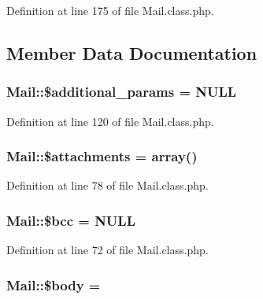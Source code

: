 Definition at line 175 of file Mail.\+class.\+php.



\subsection{Member Data Documentation}
\hypertarget{classMail_a38466de017089677f088c9a4025f724f}{}
\subsubsection[{\$additional\+\_\+params}]{\setlength{\rightskip}{0pt plus 5cm}Mail\+::\$additional\+\_\+params = N\+U\+L\+L}\label{classMail_a38466de017089677f088c9a4025f724f}


Definition at line 120 of file Mail.\+class.\+php.

\hypertarget{classMail_a93b05b1003cc8ea16b59c00d77f47466}{}
\subsubsection[{\$attachments}]{\setlength{\rightskip}{0pt plus 5cm}Mail\+::\$attachments = array()}\label{classMail_a93b05b1003cc8ea16b59c00d77f47466}


Definition at line 78 of file Mail.\+class.\+php.

\hypertarget{classMail_a2e25b3c43459422d40765d581b165692}{}
\subsubsection[{\$bcc}]{\setlength{\rightskip}{0pt plus 5cm}Mail\+::\$bcc = N\+U\+L\+L}\label{classMail_a2e25b3c43459422d40765d581b165692}


Definition at line 72 of file Mail.\+class.\+php.

\hypertarget{classMail_acbd542849121b33a76ed63e1c4670e02}{}
\subsubsection[{\$body}]{\setlength{\rightskip}{0pt plus 5cm}Mail\+::\$body = \textquotesingle{}\textquotesingle{}}\label{classMail_acbd542849121b33a76ed63e1c4670e02}


